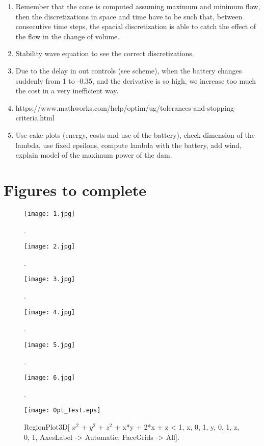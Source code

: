 \documentclass[12pt]{article}
\theoremstyle{definition}
\theoremstyle{remark}
\begin{document}
\begin{enumerate}
\item Remember that the cone is computed assuming maximum and minimum flow, then the discretizations in space and time have to be such that, between consecutive time steps, the spacial discretization is able to catch the effect of the flow in the change of volume.

\item Stability wave equation to see the correct discretizations.

\item Due to the delay in out controls (see scheme), when the battery changes suddenly from 1 to -0.35, and the derivative is so high, we increase too much the cost in a very inefficient way.

\item https://www.mathworks.com/help/optim/ug/tolerances-and-stopping-criteria.html

\item Use cake plots (energy, costs and use of the battery), check dimension of the lambda, use fixed epsilons, compute lambda with the battery, add wind, explain model of the maximum power of the dam.

\end{enumerate}

\section{Figures to complete}
\begin{figure}[ht!]
\centering
\texttt{[image: 1.jpg]}
\caption{.}
\end{figure}
\begin{figure}[ht!]
\centering
\texttt{[image: 2.jpg]}
\caption{.}
\end{figure}
\begin{figure}[ht!]
\centering
\texttt{[image: 3.jpg]}
\caption{.}
\end{figure}
\begin{figure}[ht!]
\centering
\texttt{[image: 4.jpg]}
\caption{.}
\end{figure}
\begin{figure}[ht!]
\centering
\texttt{[image: 5.jpg]}
\caption{.}
\label{fixing}
\end{figure}
\begin{figure}[ht!]
\centering
\texttt{[image: 6.jpg]}
\caption{.}
\end{figure}
\begin{figure}[ht!]
\centering
\texttt{[image: Opt\_Test.eps]}
\caption{RegionPlot3D[
 $x^2$ + $y^2$ + $z^2$ + x*y + 2*x + z < 1, {x, 0, 1}, {y, 0, 1}, {z, 0, 1},
  AxesLabel -> Automatic, FaceGrids -> All].}
\end{figure}
\end{document}
